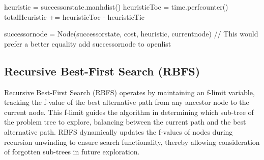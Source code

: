 \documentclass{article}
\begin{document}
\begin{algorithm}[h]
\begin{algorithmic}
            \Else 
            \State heuristic = successorstate.manhdist()
            \EndIf
            \State heuristicToc = time.perfcounter()
            \State totalHeuristic += heuristicToc - heuristicTic
            
            \State successornode = Node(successorstate, cost, heuristic, currentnode)
              // This would prefer a better equality
            \State add successornode to openlist
            \EndIf

            \EndFor
            \EndWhile

   \end{algorithmic}
   
   
   \label{alg:A$^*$}
 \end{algorithm}


\subsection{Recursive Best-First Search (RBFS)}
Recursive Best-First Search (RBFS) operates by maintaining an f-limit variable, tracking the f-value of the best alternative path from any ancestor node to the current node. This f-limit guides the algorithm in determining which sub-tree of the problem tree to explore, balancing between the current path and the best alternative path. RBFS dynamically updates the f-values of nodes during recursion unwinding to ensure search functionality, thereby allowing consideration of forgotten sub-trees in future exploration.
\end{document}
